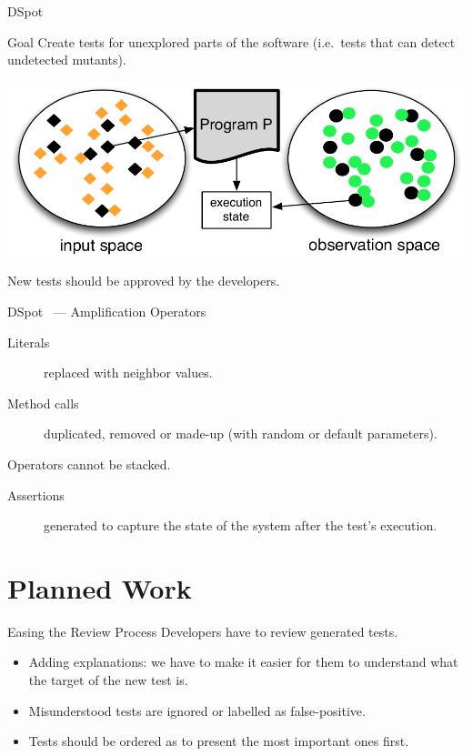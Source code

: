 \documentclass{beamer}
\begin{document}
\begin{frame}{DSpot~\cite{baudry2015dspot}}
  \begin{block}{Goal}
    Create tests for unexplored parts of the software (i.e.\ tests that can detect undetected mutants).
  \end{block}

  \begin{center}
    \includegraphics[scale=0.5]{io-spaces.pdf}

  \end{center}

  \pause{}

  \alert{New tests should be approved by the developers.}
\end{frame}
\begin{frame}{DSpot~\cite{baudry2015dspot} --- Amplification Operators}
  \begin{description}
    \item[Literals] replaced with neighbor values.
    \item[Method calls] duplicated, removed or made-up (with random or default parameters).
  \end{description}
  Operators cannot be stacked.

  \vfill

  \begin{description}
    \item[Assertions] generated to capture the state of the system after the test's execution.
  \end{description}
\end{frame}


\section{Planned Work}

\begin{frame}{Easing the Review Process}
  Developers have to review generated tests.
  \begin{itemize}
    \item Adding explanations: we have to make it easier for them to understand what the target of the new test is.
    \item Misunderstood tests are ignored or labelled as false-positive.
    \item Tests should be ordered as to present the most important ones first.
  \end{itemize}
\end{frame}
\end{document}
